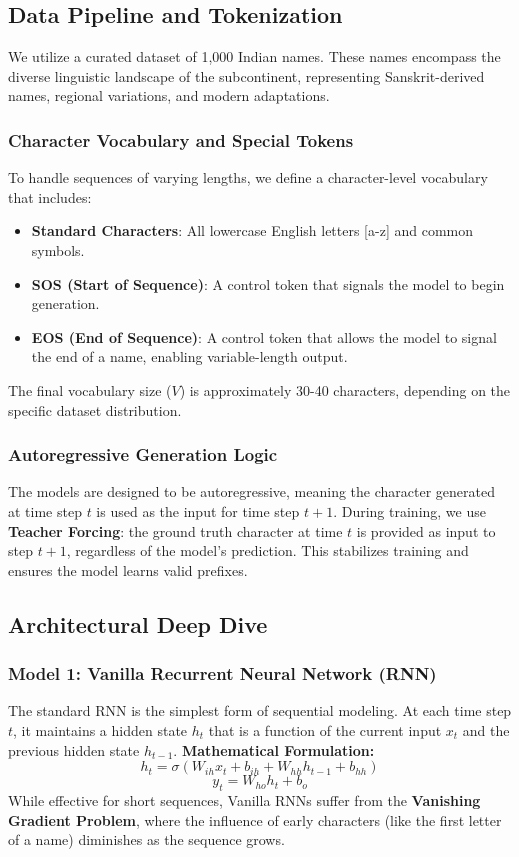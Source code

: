 \documentclass[12pt,a4paper]{article}
\begin{document}
\subsection{Data Pipeline and Tokenization}
We utilize a curated dataset of 1,000 Indian names. These names encompass the diverse linguistic landscape of the subcontinent, representing Sanskrit-derived names, regional variations, and modern adaptations.

\subsubsection{Character Vocabulary and Special Tokens}
To handle sequences of varying lengths, we define a character-level vocabulary that includes:
\begin{itemize}
    \item \textbf{Standard Characters}: All lowercase English letters [a-z] and common symbols.
    \item \textbf{SOS (Start of Sequence)}: A control token that signals the model to begin generation.
    \item \textbf{EOS (End of Sequence)}: A control token that allows the model to signal the end of a name, enabling variable-length output.
\end{itemize}
The final vocabulary size ($V$) is approximately 30-40 characters, depending on the specific dataset distribution.

\subsubsection{Autoregressive Generation Logic}
The models are designed to be autoregressive, meaning the character generated at time step $t$ is used as the input for time step $t+1$. During training, we use \textbf{Teacher Forcing}: the ground truth character at time $t$ is provided as input to step $t+1$, regardless of the model's prediction. This stabilizes training and ensures the model learns valid prefixes.

\subsection{Architectural Deep Dive}

\subsubsection{Model 1: Vanilla Recurrent Neural Network (RNN)}
The standard RNN is the simplest form of sequential modeling. At each time step $t$, it maintains a hidden state $h_t$ that is a function of the current input $x_t$ and the previous hidden state $h_{t-1}$.
\textbf{Mathematical Formulation:}
\begin{equation}
    h_t = \sigma(W_{ih} x_t + b_{ih} + W_{hh} h_{t-1} + b_{hh})
\end{equation}
\begin{equation}
    y_t = W_{ho} h_t + b_o
\end{equation}
While effective for short sequences, Vanilla RNNs suffer from the \textbf{Vanishing Gradient Problem}, where the influence of early characters (like the first letter of a name) diminishes as the sequence grows.
\end{document}
